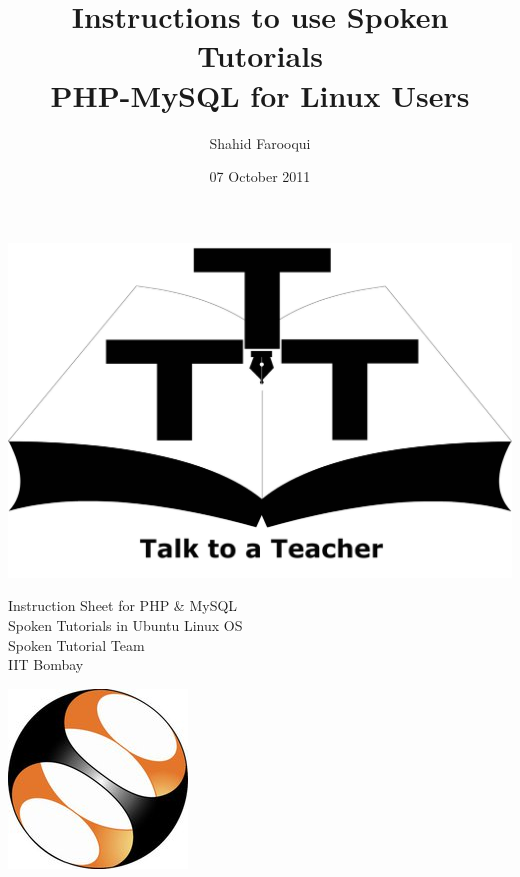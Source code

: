 \documentclass[11pt]{article}
\title{Instructions to use Spoken Tutorials \\
  PHP-MySQL for Linux Users}
\author{Shahid Farooqui}
\date{07 October 2011}
\begin{document}
\begin{minipage}[t]{0.15\textwidth}
  \includegraphics[width=\linewidth]{3t-logo}
\end{minipage} \hfill
\begin{minipage}[t]{0.65\textwidth}
  \begin{center}
    \vspace{-0.7in}
    \Large
    Instruction Sheet for PHP \& MySQL \\
    Spoken Tutorials in Ubuntu Linux OS \\
    \large
    Spoken Tutorial Team \\
    IIT Bombay \\
  \end{center}
\end{minipage} \hfill
\begin{minipage}[t]{0.12\textwidth}
  \includegraphics[width=\linewidth]{st-logo.jpg}
\end{minipage}
\end{document}
